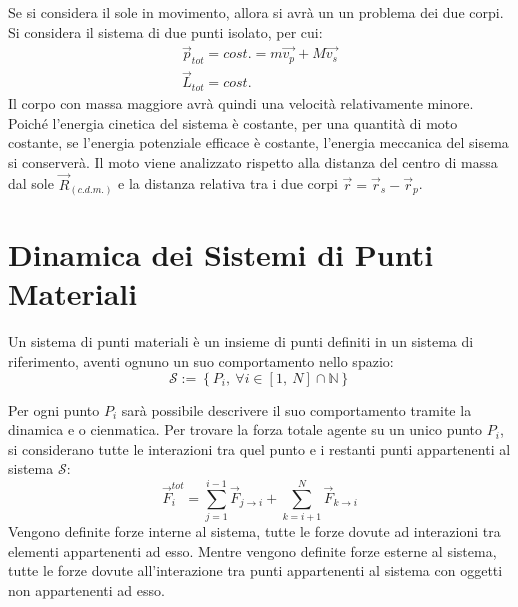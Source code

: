 \documentclass{article}
\numberwithin{equation}{subsection}
\begin{document}
Se si considera il sole in movimento, allora si avrà un un problema dei due corpi. Si considera il sistema di due punti isolato, per cui:
\begin{gather*}
    \vec{p}_{tot}=cost.=m\vec{v_p}+M\vec{v_s}\\
    \vec{L}_{tot}=cost.
\end{gather*}
Il corpo con massa maggiore avrà quindi una velocità relativamente minore. Poiché l'energia cinetica del sistema è costante, per una quantità di moto costante, 
se l'energia potenziale efficace è costante, l'energia meccanica del sisema si conserverà. Il moto viene analizzato rispetto alla distanza 
del centro di massa dal sole $\vec{R}_{(c.d.m.)}$ e la distanza relativa tra i due corpi $\vec{r}=\vec{r}_s-\vec{r}_p$. 

\clearpage

\section{Dinamica dei Sistemi di Punti Materiali}

Un sistema di punti materiali è un insieme di punti definiti 
in un sistema di riferimento, aventi ognuno un suo 
comportamento nello spazio:
\begin{equation}
    \mathscr{S}:=\left\{P_i,\:\forall i\in[1,\:N]\cap\mathbb{N}\right\}
\end{equation}

\begin{center}\end{center}

Per ogni punto $P_i$ sarà possibile descrivere il suo 
comportamento tramite la dinamica e o cienmatica. 
Per trovare la forza totale agente su un unico punto $P_i$, si 
considerano tutte le interazioni tra quel punto e i restanti punti 
appartenenti al sistema $\mathscr{S}$:
\begin{equation}
    \vec{F}^{tot}_i=\displaystyle\sum_{j=1}^{i-1}\vec{F}_{j\to i}+\sum_{k=i+1}^{N}\vec{F}_{k\to i}
\end{equation}
Vengono definite forze interne al sistema, tutte le forze 
dovute ad interazioni tra elementi appartenenti ad esso.
Mentre vengono definite forze esterne al sistema, tutte le forze 
dovute all'interazione tra punti appartenenti al sistema con 
oggetti non appartenenti ad esso. 
\end{document}
